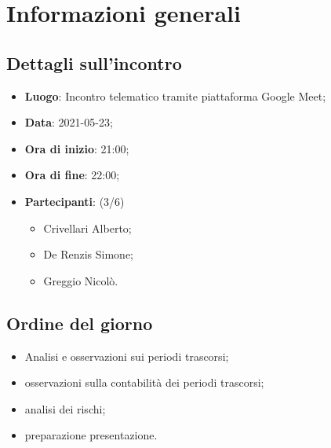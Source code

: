 \section{Informazioni generali}

\subsection{Dettagli sull'incontro}
\begin{itemize}
\item \textbf{Luogo}: Incontro telematico tramite piattaforma Google Meet;
\item \textbf{Data}: 2021-05-23;
\item \textbf{Ora di inizio}: 21:00;
\item \textbf{Ora di fine}: 22:00;
\item \textbf{Partecipanti}: (3/6) 
\begin{itemize}
	\item Crivellari Alberto;
	\item De Renzis Simone;
	\item Greggio Nicolò.

\end{itemize}
\end{itemize}

\subsection{Ordine del giorno}
\begin{itemize}
	\item Analisi e osservazioni sui periodi trascorsi;
	\item osservazioni sulla contabilità dei periodi trascorsi;
	\item analisi dei rischi;
	\item preparazione presentazione.
\end{itemize}


